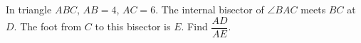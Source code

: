 In triangle $ ABC $, $ AB=4 $, $ AC=6 $. The internal bisector of $\angle BAC $ meets $ BC $ at $ D $. The foot from $ C $ to this bisector is $ E $. Find $\dfrac{AD}{AE}$.
